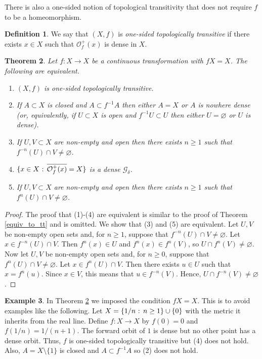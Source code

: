 \documentclass[12pt]{article}
\newtheorem{theorem}{Theorem}[section]
\theoremstyle{definition}
\newtheorem{definition}[theorem]{Definition}
\newtheorem{example}[theorem]{Example}
\theoremstyle{remark}
\begin{document}
There is also a one-sided notion of topological transitivity that does not require $f$ to be a homeomorphism.

\begin{definition}
We say that $(X,f)$ is {\it one-sided topologically transitive} if there exists $x \in X$ such that
$\mathcal O_f^+(x)$ is dense in $X$.
\end{definition}

\begin{theorem} \label{equiv_to_ostt}
Let $f : X \to X$ be a continuous transformation with $fX=X$.
The following are equivalent.
\begin{enumerate}
\item[(1)]
$(X,f)$ is one-sided topologically transitive.
\item[(2)]
If $A \subset X$ is closed and $A \subset f^{-1}A$ then either $A=X$ or $A$ is nowhere dense (or,
equivalently, if $U \subset X$ is open and $f^{-1}U \subset U$ then either $U = \varnothing$ or $U$ is dense).
\item[(3)]
If $U,V \subset X$ are non-empty and open then there exists $n \ge 1$ such that
$f^{-n}(U) \cap V \ne \varnothing$.
\item[(4)]
$\{x \in X \hbox{ : } \overline{\mathcal O^+_f(x)}=X\}$ is a dense $\mathcal G_\delta$.
\item[(5)]
If $U,V \subset X$ are non-empty and open 
then there exists $n \ge 1$ such that $f^n(U) \cap V \ne \varnothing$.
\end{enumerate}
\end{theorem}

\begin{proof}
The proof that (1)-(4) are equivalent is similar to the proof of Theorem \ref{equiv_to_tt} and is omitted. We show that (3) and (5) are equivalent.
Let $U,V$ be non-empty open sets and, for $n \ge 1$, suppose that 
$f^{-n}(U) \cap V \ne \varnothing$. Let $x \in f^{-n}(U) \cap V$. Then $f^n(x) \in U$ and
$f^n(x) \in f^n(V)$, so $U \cap f^n(V) \ne \varnothing$.
Now let $U,V$ be non-empty open sets and, for $n \ge 0$, suppose that 
$f^{n}(U) \cap V \ne \varnothing$. Let $x \in f^{n}(U) \cap V$. Then there exists $u\in U$ 
such that $x=f^n(u)$. Since $x \in V$, this means that $u \in f^{-n}(V)$. Hence,
$U \cap f^{-n}(V) \ne \varnothing$. 
\end{proof}

\begin{example}
In Theorem \ref{equiv_to_ostt} we imposed the condition $fX=X$. This is to avoid examples like the following.
Let $X = \{1/n \hbox{ : } n \ge 1\} \cup \{0\}$ with the metric it inherits from the real line. Define
$f : X \to X$ by $f(0)=0$ and $f(1/n) = 1/(n+1)$. The forward orbit of $1$ is dense but no other point has a dense orbit. Thus, $f$ is one-sided topologically transitive but (4) does not hold.
Also, $A = X \setminus \{1\}$ is closed and $A \subset f^{-1}A$ so (2) does not hold.
\end{example}
\end{document}
